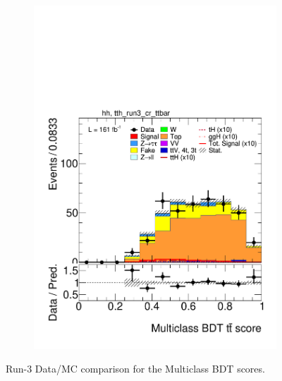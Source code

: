 \begin{figure}[htbp]
\begin{subfigure}[b]{0.49\textwidth}
    \includegraphics[width=\textwidth]{images/plots_modelling_run2_run3_variables/run_3_tth/plot_tth_th_multiclass_ttbar_hh_tth_run3_cr_ttbar_22_23_24.pdf}
    \caption{}
    \label{fig:overtrain_bkg}
  \end{subfigure}

  \caption{Run-3 Data/MC comparison for the Multiclass BDT scores.}
  \label{scores_modelling}
\end{figure}


